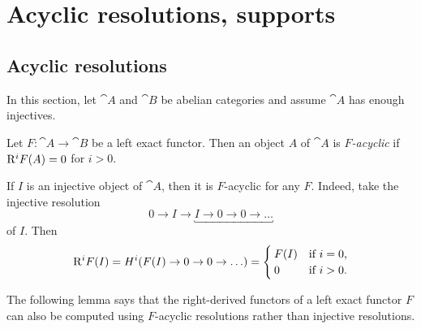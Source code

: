 \chapter{Acyclic resolutions, supports}

\section{Acyclic resolutions}
\noindent
In this section, let \(\cat A\) and \(\cat B\) be abelian categories and assume \(\cat A\) has enough injectives.

\begin{defn}
Let \(F\colon\cat A\to\cat B\) be a left exact functor.
Then an object \(A\) of \(\cat A\) is \emph{\(F\)-acyclic} if \(\mathrm{R}^iF(A)=0\) for \(i>0\).
\end{defn}

\begin{exmp}
If \(I\) is an injective object of \(\cat A\), then it is \(F\)-acyclic for any \(F\).
Indeed, take the injective resolution
\[ 0 \to I \to \underbracket{I \to 0 \to 0 \to \ldots} \]
of \(I\).
Then
\[ \mathrm{R}^iF(I) = H^i(F(I)\to 0\to 0\to\ldots) =
  \begin{cases}
    F(I) & \text{if } i=0\text{,} \\
    0 & \text{if } i>0\text{.}
  \end{cases}
\]
\end{exmp}

The following lemma says that the right-derived functors of a left exact functor \(F\) can also be computed using \(F\)-acyclic resolutions rather than injective resolutions.

